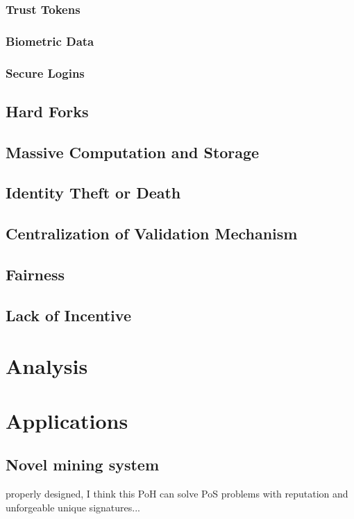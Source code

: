 \documentclass{article}
\begin{document}
\subsubsection*{Trust Tokens}
\subsubsection*{Biometric Data}
\subsubsection*{Secure Logins}

\subsection{Hard Forks}
\subsection{Massive Computation and Storage}
\subsection{Identity Theft or Death}
\subsection{Centralization of Validation Mechanism}
\subsection{Fairness}
\subsection{Lack of Incentive}


\section{Analysis}

 
\section{Applications}

\subsection{Novel mining system}
properly designed, I think this PoH can solve PoS problems with reputation and unforgeable unique signatures...
\end{document}
